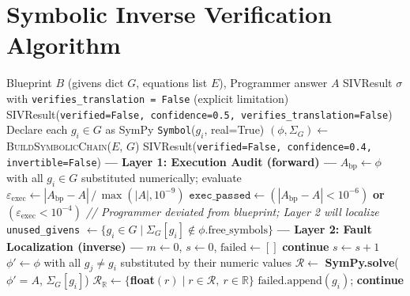 \documentclass[11pt,a4paper]{article}
\begin{document}
\section{Symbolic Inverse Verification Algorithm}
\label{app:siv}
\begin{algorithm}[H]
\caption{Symbolic Inverse Verification (SIV) — Two-Layer Execution Audit}
\label{alg:siv}
\begin{algorithmic}[1]
\Require Blueprint $B$ (givens dict $G$, equations list $E$), Programmer answer $A$
\Ensure SIVResult $\sigma$ with \texttt{verifies\_translation = False} (explicit limitation)
    \State \Return SIVResult(\texttt{verified=False, confidence=0.5, verifies\_translation=False})
\EndIf
\State Declare each $g_i \in G$ as SymPy \texttt{Symbol}($g_i$, real=True)
\State $(\phi, \Sigma_G) \gets $ \textsc{BuildSymbolicChain}($E$, $G$) 
    \State \Return SIVResult(\texttt{verified=False, confidence=0.4, invertible=False})
\EndIf
\vspace{2pt}
\State \textbf{--- Layer 1: Execution Audit (forward) ---}
\State $A_{\text{bp}} \gets \phi$ with all $g_i \in G$ substituted numerically; evaluate
\State $\varepsilon_{\text{exec}} \gets |A_{\text{bp}} - A| \,/\, \max(|A|, 10^{-9})$
\State $\texttt{exec\_passed} \gets (|A_{\text{bp}} - A| < 10^{-6})$ \textbf{or} $(\varepsilon_{\text{exec}} < 10^{-4})$
    \State \textit{// Programmer deviated from blueprint; Layer 2 will localize}
\EndIf
\State \texttt{unused\_givens} $\gets \{g_i \in G \mid \Sigma_G[g_i] \notin \phi.\text{free\_symbols}\}$
\vspace{2pt}
\State \textbf{--- Layer 2: Fault Localization (inverse) ---}
\State $m \gets 0$, \; $s \gets 0$, \; $\text{failed} \gets []$
        \State \textbf{continue} 
    \EndIf
    \State $s \gets s + 1$
    \State $\phi' \gets \phi$ with all $g_j \neq g_i$ substituted by their numeric values
    \State $\mathcal{R} \gets $ \textbf{SymPy.solve}($\phi' = A$, $\Sigma_G[g_i]$)
    \State $\mathcal{R}_{\mathbb{R}} \gets \{$\textbf{float}$(r) \mid r \in \mathcal{R},\ r \in \mathbb{R}\}$ 
        \State $\text{failed}.\text{append}(g_i)$; \textbf{continue}
    \EndIf

\end{algorithmic}
\end{algorithm}
\end{document}
